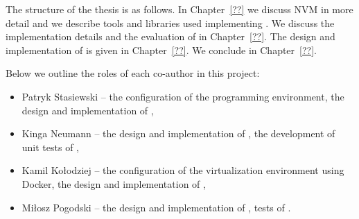 The structure of the thesis is as follows. In Chapter~\ref{??} we discuss NVM in more detail and we describe tools and libraries used implementing  . We discuss the implementation details and the evaluation of \PHT in Chapter~\ref{??}. The design and implementation of  is given in Chapter~\ref{??}. We conclude in Chapter~\ref{??}.

\bigskip

\noindent Below we outline the roles of each co-author in this project:
\begin{itemize}
    \item Patryk Stasiewski -- the configuration of the \NVM programming environment, the design and implementation of \PHT,
    \item Kinga Neumann -- the design and implementation of \PHT, the development of unit tests of \PHT,
    \item Kamil Kołodziej -- the configuration of the virtualization environment using Docker, the design and implementation of ,
    \item Miłosz Pogodski -- the design and implementation of , tests of .
\end{itemize}


\endinput

NVM is particularly 
Today's servers scales well horizontally providing high performance in handling concurrent requests.
Despite the fact that throughput is high enough, processing is often limited by execution of I/O operations between memory stack.
The expensive access to storage problem is especially visible in peer-to-peer systems where the data is spread between nodes. 
If one of them crashes and needs to reboot, its data is lost. 
Reloading it each time from the disk space results in a significant time overhead.
Therefore, using \textit{non-volatile memory}, which supports direct access, is a better choice for a distributed system.
NVM is a type of computer memory which provides persistent data storage at the expense of slightly higher cost and lower performance than RAM.
Keeping that in mind NVM can be a new future development trend.
Once loaded, data will be available for system to access whether it is newly booted system or working one.


In order to get acquainted with the described technology we decided to implement a distributed hashmap which supports persistent memory.
Given that idea we could get to know the benefits and drawbacks of NVM and then adapt it to a real use case while developing a distributed system.
We assumed that it should operate on a modern architecture with NVM on the processor's memory bus.
Despite the fact that the introduced solution is still in development, it can be emulated with RAM.
Keeping that in mind the performance evaluations could be slightly inaccurate but should give us a brief overview of new possibilities.

